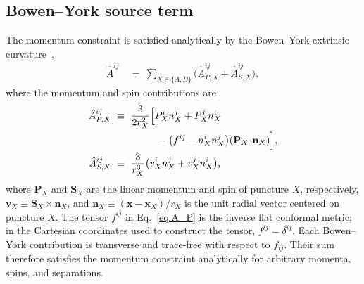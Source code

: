 \documentclass[
  aps,
  prd,
  twocolumn,
  amsmath,
  amssymb,
  nofootinbib,
  superscriptaddress,
  floatfix,
]{revtex4-2}
\newcommand{\Ahat}{\hat{A}}
\begin{document}
\subsection{Bowen--York source term}
\label{sec:problem:source}
The momentum constraint is satisfied analytically by the Bowen--York extrinsic
curvature~\cite{BowenYork1980},
\begin{align}
  \Ahat^{ij} \ &= \ \sum_{X\in\{A,B\}} \bigl(\Ahat^{ij}_{P,X} + \Ahat^{ij}_{S,X}\bigr),
\end{align}
where the momentum and spin contributions are
\begin{align}
  \Ahat^{ij}_{P,X} \ &\equiv \ \frac{3}{2 r_X^2}\Bigl[
  P_X^i n_X^j + P_X^j n_X^i \nonumber \\
  & \hspace{15mm} - \bigl(f^{ij} - n_X^i n_X^j\bigr)(\mathbf{P}_X\!\cdot\!\mathbf{n}_X)\Bigr],
  \label{eq:A_P}
  \\
  \Ahat^{ij}_{S,X} \ &\equiv \ \frac{3}{r_X^3}\bigl(v_X^i n_X^j + v_X^j n_X^i\bigr),
  \label{eq:A_S}
\end{align}
where $\mathbf{P}_X$ and $\mathbf{S}_X$ are the linear momentum and spin of
puncture $X$, respectively,
$\mathbf{v}_X \equiv \mathbf{S}_X\times\mathbf{n}_X$, and
$\mathbf{n}_X \equiv (\mathbf{x}-\mathbf{x}_X)/r_X$ is the unit
radial vector centered on puncture $X$. The tensor $f^{ij}$ in Eq.~\eqref{eq:A_P} is the inverse flat
conformal metric; in the Cartesian coordinates used to construct the tensor,
$f^{ij}=\delta^{ij}$. Each Bowen--York contribution is transverse and
trace-free with respect to $f_{ij}$. Their sum therefore satisfies the momentum
constraint analytically for arbitrary momenta, spins, and separations.
\end{document}
